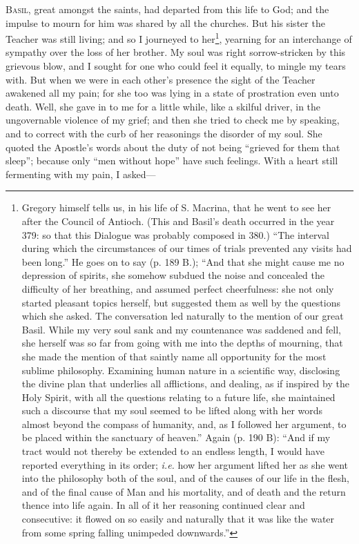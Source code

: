 \textsc{Basil}, great amongst the saints, had departed from this life to God; and the impulse to mourn for him was shared by all the churches. But his sister the Teacher was still living; and so I journeyed to her\footnote{Gregory himself tells us, in his life of S. Macrina, that he went to see her after the Council of Antioch. (This and Basil’s death occurred in the year 379: so that this Dialogue was probably composed in 380.) “The interval during which the circumstances of our times of trials prevented any visits had been long.” He goes on to say (p. 189 B.); “And that she might cause me no depression of spirits, she somehow subdued the noise and concealed the difficulty of her breathing, and assumed perfect cheerfulness: she not only started pleasant topics herself, but suggested them as well by the questions which she asked. The conversation led naturally to the mention of our great Basil. While my very soul sank and my countenance was saddened and fell, she herself was so far from going with me into the depths of mourning, that she made the mention of that saintly name all opportunity for the most sublime philosophy. Examining human nature in a scientific way, disclosing the divine plan that underlies all afflictions, and dealing, as if inspired by the Holy Spirit, with all the questions relating to a future life, she maintained such a discourse that my soul seemed to be lifted along with her words almost beyond the compass of humanity, and, as I followed her argument, to be placed within the sanctuary of heaven.” Again (p. 190 B): “And if my tract would not thereby be extended to an endless length, I would have reported everything in its order; \emph{i.e.} how her argument lifted her as she went into the philosophy both of the soul, and of the causes of our life in the flesh, and of the final cause of Man and his mortality, and of death and the return thence into life again. In all of it her reasoning continued clear and consecutive: it flowed on so easily and naturally that it was like the water from some spring falling unimpeded downwards.”}, yearning for an interchange of sympathy over the loss of her brother. My soul was right sorrow-stricken by this grievous blow, and I sought for one who could feel it equally, to mingle my tears with. But when we were in each other’s presence the sight of the Teacher awakened all my pain; for she too was lying in a state of prostration even unto death. Well, she gave in to me for a little while, like a skilful driver, in the ungovernable violence of my grief; and then she tried to check me by speaking, and to correct with the curb of her reasonings the disorder of my soul. She quoted the Apostle’s words about the duty of not being “grieved for them that sleep”; because only “men without hope” have such feelings. With a heart still fermenting with my pain, I asked—

